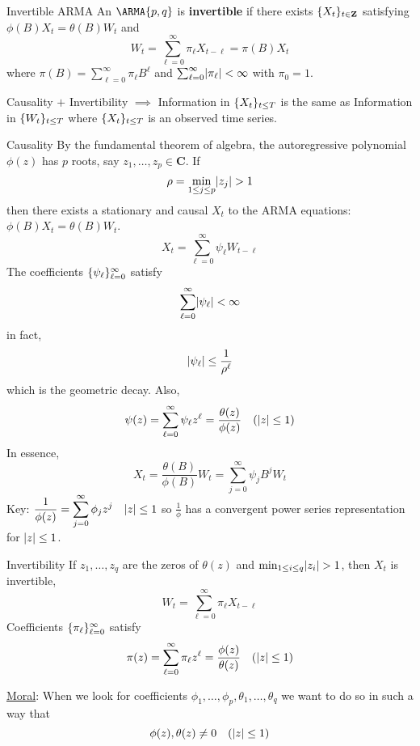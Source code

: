 \begin{Definition}{Invertible ARMA}{}
    An $ \ARMA{p,q} $ is \textbf{invertible} if there exists $ \{X_t\}_{t\in\mathbf{Z}} $ satisfying
    $ \phi(B)X_t=\theta(B)W_t $ and
    \[ W_t=\sum_{\ell=0}^{\infty} \pi_\ell X_{t-\ell}=\pi(B)X_t \]
    where $ \pi(B)=\sum_{\ell=0}^{\infty} \pi_\ell B^\ell $
    and $ \sum_{\ell=0}^{\infty} \lvert\pi_\ell\rvert<\infty $ with
    $ \pi_0=1 $.
\end{Definition}
\begin{Remark}{}{}
    Causality $ + $ Invertibility $ \implies  $ Information
    in $ \{X_t\}_{t\le T} $ is the same as Information in
    $ \{W_t\}_{t\le T} $ where $ \{X_t\}_{t\le T} $ is
    an observed time series.
\end{Remark}
\begin{Theorem}{Causality}{}
    By the fundamental theorem of algebra, the autoregressive
    polynomial $ \phi(z) $ has $ p $ roots,
    say $ z_1,\ldots,z_p\in\mathbf{C} $. If
    \[ \rho=\min_{1\le j\le p}\lvert z_j\rvert>1 \]
    then there exists a stationary and causal $ X_t $
    to the ARMA equations: $ \phi(B)X_t=\theta(B)W_t $.
    \[ X_t=\sum_{\ell=0}^{\infty} \psi_\ell W_{t-\ell} \]
    The coefficients $ \{\psi_\ell\}_{\ell=0}^\infty $
    satisfy
    \[ \sum_{\ell=0}^{\infty} \lvert\psi_\ell\rvert<\infty \]
    in fact,
    \[ \lvert\psi_\ell\rvert\le \frac{1}{\rho^\ell}  \]
    which is the geometric decay. Also,
    \[ \psi(z)=\sum_{\ell=0}^{\infty}\psi_\ell z^\ell=\frac{\theta(z)}{\phi(z)}
        \quad(\lvert z\rvert\le 1)  \]
    In essence,
    \[ X_t=\frac{\theta(B)}{\phi(B)}W_t=\sum_{j=0}^{\infty} \psi_j B^j W_t  \]
    Key: $ \displaystyle \frac{1}{\phi(z)}=\sum_{j=0}^{\infty}
        \phi_j z^j\quad\lvert z\rvert\le 1 $ so $ \displaystyle \frac{1}{\phi} $ has a convergent power
    series representation for $ \lvert z\rvert\le 1 $.
\end{Theorem}
\begin{Theorem}{Invertibility}{}
    If $ z_1,\ldots,z_q $ are the zeros
    of $ \theta(z) $ and $ \min_{1\le i\le q}\lvert z_i\rvert>1 $,
    then $ X_t $ is invertible,
    \[ W_t=\sum_{\ell=0}^{\infty} \pi_\ell X_{t-\ell} \]
    Coefficients $ \{\pi_\ell\}_{\ell=0}^\infty $ satisfy
    \[ \pi(z)=\sum_{\ell=0}^{\infty} \pi_\ell z^\ell =\frac{\phi(z)}{\theta(z)}
        \quad (\lvert z\rvert\le 1)  \]
\end{Theorem}
\underline{Moral}: When we look for coefficients
$ \phi_1,\ldots,\phi_p,\theta_1,\ldots,\theta_q $
we want to do so in such a way that
\[ \phi(z),\theta(z)\ne 0\quad(\lvert z\rvert\le 1) \]
